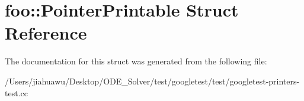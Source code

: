 \hypertarget{structfoo_1_1_pointer_printable}{}\section{foo\+:\+:Pointer\+Printable Struct Reference}
\label{structfoo_1_1_pointer_printable}


The documentation for this struct was generated from the following file\+:\begin{DoxyCompactItemize}
\item 
/\+Users/jiahuawu/\+Desktop/\+O\+D\+E\+\_\+\+Solver/test/googletest/test/googletest-\/printers-\/test.\+cc\end{DoxyCompactItemize}
